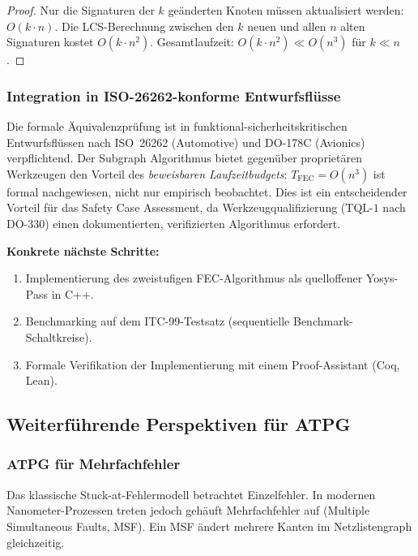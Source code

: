 ﻿\documentclass[a4paper,12pt]{article}
\theoremstyle{definition}
\begin{document}
\begin{proof}
  Nur die Signaturen der $k$ geänderten Knoten müssen aktualisiert werden: $O(k \cdot n)$.
  Die LCS-Berechnung zwischen den $k$ neuen und allen $n$ alten Signaturen kostet
  $O(k \cdot n^2)$. Gesamtlaufzeit: $O(k \cdot n^2) \ll O(n^3)$ für $k \ll n$.
\end{proof}

\subsubsection{Integration in ISO-26262-konforme Entwurfsflüsse}

Die formale Äquivalenzprüfung ist in funktional-sicherheitskritischen Entwurfsflüssen
nach ISO~26262 (Automotive) und DO-178C (Avionics) verpflichtend. Der Subgraph
Algorithmus bietet gegenüber proprietären Werkzeugen den Vorteil des
\emph{beweisbaren Laufzeitbudgets}: $T_{\text{FEC}} = O(n^3)$ ist formal nachgewiesen,
nicht nur empirisch beobachtet. Dies ist ein entscheidender Vorteil für das Safety Case
Assessment, da Werkzeugqualifizierung ($\text{TQL-1}$ nach DO-330) einen
dokumentierten, verifizierten Algorithmus erfordert.

\textbf{Konkrete nächste Schritte:}
\begin{enumerate}
  \item Implementierung des zweistufigen FEC-Algorithmus als quelloffener
        Yosys-Pass \cite{wolf2013yosys} in C++.
  \item Benchmarking auf dem ITC-99-Testsatz (sequentielle Benchmark-Schaltkreise).
  \item Formale Verifikation der Implementierung mit einem Proof-Assistant (Coq, Lean).
\end{enumerate}

\subsection{Weiterführende Perspektiven für ATPG}

\subsubsection{ATPG für Mehrfachfehler}

Das klassische Stuck-at-Fehlermodell betrachtet Einzelfehler. In modernen
Nanometer-Prozessen treten jedoch gehäuft Mehrfachfehler auf (Multiple Simultaneous
Faults, MSF). Ein MSF ändert mehrere Kanten im Netzlistengraph gleichzeitig.
\end{document}
